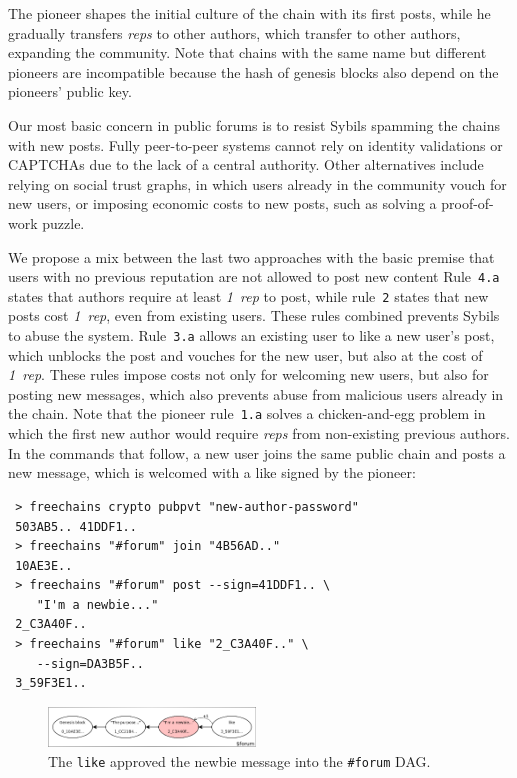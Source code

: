 \documentclass[10pt,journal,compsoc]{IEEEtran}
\newcommand{\reps}     {\emph{reps}\xspace}
\newcommand{\onerep}   {\emph{1~rep}\xspace}
\begin{document}
The pioneer shapes the initial culture of the chain with its first posts, while
he gradually transfers \reps to other authors, which transfer to other authors,
expanding the community.
%
Note that chains with the same name but different pioneers are incompatible
because the hash of genesis blocks also depend on the pioneers' public key.

Our most basic concern in public forums is to resist Sybils spamming the chains
with new posts.
Fully peer-to-peer systems cannot rely on identity validations or CAPTCHAs due
to the lack of a central authority.
Other alternatives include relying on social trust graphs, in which users
already in the community vouch for new users, or imposing economic costs to new
posts, such as solving a proof-of-work puzzle.

We propose a mix between the last two approaches with the basic premise that
users with no previous reputation are not allowed to post new content
Rule~\texttt{4.a} states that authors require at least \onerep to post, while
rule~\texttt{2} states that new posts cost \onerep, even from existing users.
These rules combined prevents Sybils to abuse the system.
Rule~\texttt{3.a} allows an existing user to like a new user's post, which
unblocks the post and vouches for the new user, but also at the cost of
\onerep.
These rules impose costs not only for welcoming new users, but also for posting
new messages, which also prevents abuse from malicious users already in the
chain.
%
Note that the pioneer rule~\texttt{1.a} solves a chicken-and-egg problem in
which the first new author would require \reps from non-existing previous
authors.
%
In the commands that follow, a new user joins the same public chain and posts a
new message, which is welcomed with a like signed by the pioneer:

{\footnotesize
\begin{verbatim}
 > freechains crypto pubpvt "new-author-password"
 503AB5.. 41DDF1..
 > freechains "#forum" join "4B56AD.."
 10AE3E..
 > freechains "#forum" post --sign=41DDF1.. \
    "I'm a newbie..."
 2_C3A40F..
 > freechains "#forum" like "2_C3A40F.." \
    --sign=DA3B5F..
 3_59F3E1..
\end{verbatim}
}

\begin{figure}[ht]
\centering
\includegraphics[width=0.49\textwidth]{forum.png}
\caption{
    The \texttt{like} approved the newbie message into the \texttt{\#forum} DAG.
}
\label{fig.forum}
\end{figure}
\end{document}
